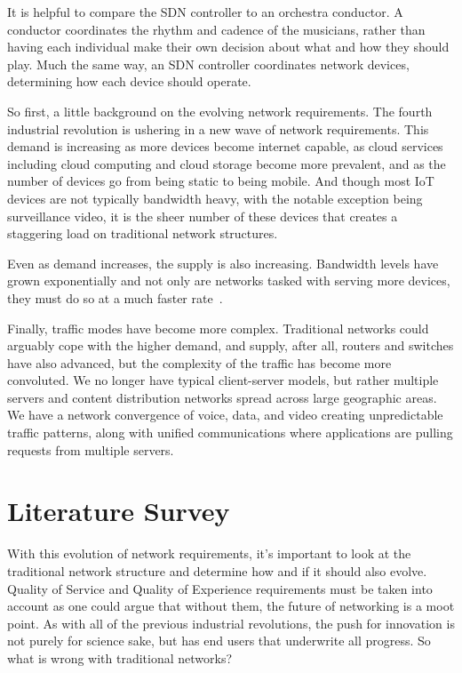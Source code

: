 \documentclass[11pt]{article}
\begin{document}
It is helpful to compare the SDN controller to an orchestra conductor. A conductor coordinates the rhythm and cadence of the musicians, rather than having each individual make their own decision about what and how they should play. Much the same way, an SDN controller coordinates network devices, determining how each device should operate.

So first, a little background on the evolving network requirements. The fourth industrial revolution is ushering in a new wave of network requirements. This demand is increasing as more devices become internet capable, as cloud services including cloud computing and cloud storage become more prevalent, and as the number of devices go from being static to being mobile. And though most IoT devices are not typically bandwidth heavy, with the notable exception being surveillance video, it is the sheer number of these devices that creates a staggering load on traditional network structures.

Even as demand increases, the supply is also increasing. Bandwidth levels have grown exponentially and not only are networks tasked with serving more devices, they must do so at a much faster rate~\cite{ONF}.

Finally, traffic modes have become more complex. Traditional networks could arguably cope with the higher demand, and supply, after all, routers and switches have also advanced, but the complexity of the traffic has become more convoluted. We no longer have typical client-server models, but rather multiple servers and content distribution networks spread across large geographic areas. We have a network convergence of voice, data, and video creating unpredictable traffic patterns, along with unified communications where applications are pulling requests from multiple servers.

\section{Literature Survey}

With this evolution of network requirements, it’s important to look at the traditional network structure and determine how and if it should also evolve. Quality of Service and Quality of Experience requirements must be taken into account as one could argue that without them, the future of networking is a moot point. As with all of the previous industrial revolutions, the push for innovation is not purely for science sake, but has end users that underwrite all progress. So what is wrong with traditional networks?
\end{document}
